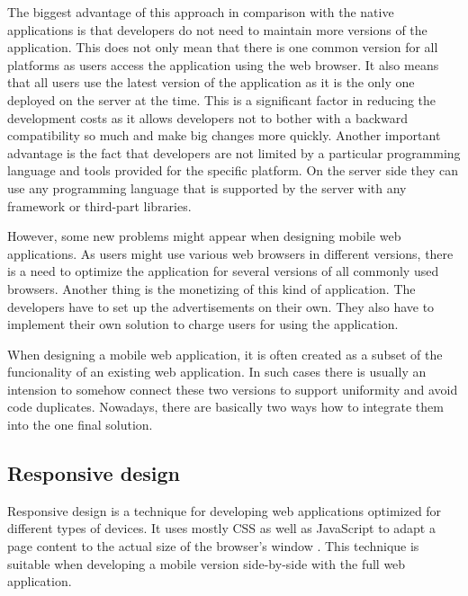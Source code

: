 \documentclass[12pt,oneside,final]{fithesis2}
\begin{document}
The biggest advantage of this approach in comparison with the native applications is that developers do not need to maintain more versions of the application.
This does not only mean that there is one common version for all platforms as users access the application using the web browser.
It also means that all users use the latest version of the application as it is the only one deployed on the server at the time.
This is a significant factor in reducing the development costs as it allows developers not to bother with a backward compatibility so much and make big changes more quickly.
Another important advantage is the fact that developers are not limited by a particular programming language and tools provided for the specific platform.
On the server side they can use any programming language that is supported by the server with any framework or third-part libraries.

However, some new problems might appear when designing mobile web applications.
As users might use various web browsers in different versions, there is a need to optimize the application for several versions of all commonly used browsers.
Another thing is the monetizing of this kind of application.
The developers have to set up the advertisements on their own.
They also have to implement their own solution to charge users for using the application.

When designing a mobile web application, it is often created as a subset of the funcionality of an existing web application.
In such cases there is usually an intension to somehow connect these two versions to support uniformity and avoid code duplicates.
Nowadays, there are basically two ways how to integrate them into the one final solution.

\subsection{Responsive design}
Responsive design is a technique for developing web applications optimized for different types of devices.
It uses mostly CSS as well as JavaScript to adapt a page content to the actual size of the browser's window \cite{marcotte11}.
This technique is suitable when developing a mobile version side-by-side with the full web application.
\end{document}
